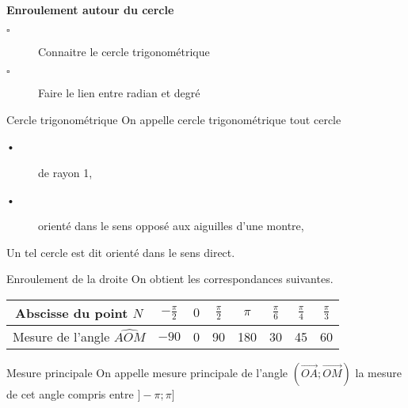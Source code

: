 \begin{titre}[Trigonométrie]

\end{titre}


\begin{CpsCol}
\textbf{Enroulement autour du cercle}
\begin{description}
\item[$\square$] Connaitre le cercle trigonométrique
\item[$\square$] Faire le lien entre radian et degré
\end{description}
\end{CpsCol}






\begin{DefT}{Cercle trigonométrique}
On appelle cercle trigonométrique tout cercle
\begin{description}
\item[•] de rayon 1,
\item[•] orienté dans le sens opposé aux aiguilles d'une montre,
\end{description} 
Un tel cercle est dit orienté dans le sens direct.
\end{DefT}




\begin{DefT}{Enroulement de la droite}
On obtient les correspondances suivantes.

\begin{tabular}{|c|c|c|c|c|c|c|c|}
\hline 
Abscisse du point $N$ & $-\frac{\pi}{2}$ & $0$ & $\frac{\pi}{2}$ & $\pi$ & $\frac{\pi}{6}$ & $\frac{\pi}{4}$ & $\frac{\pi}{3}$ \\ 
\hline 
Mesure de l'angle $\widehat{AOM}$ & $-90$ & 0 & 90 & 180 & 30 & 45 & 60 \\ 
\hline 
\end{tabular} 
\end{DefT}








\begin{DefT}{Mesure principale}
On appelle mesure principale de l'angle $\left(\overrightarrow{OA};\overrightarrow{OM} \right)$ la mesure de cet angle compris entre $]-\pi;\pi]$
\end{DefT}

